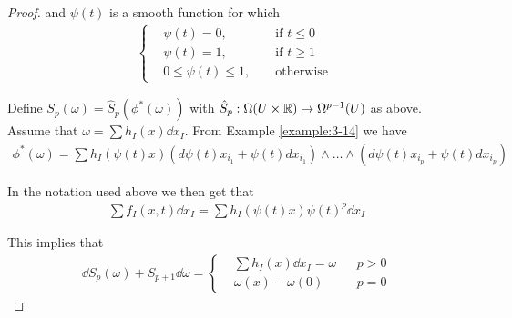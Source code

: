 \begin{proof}
and $\psi(t)$ is a smooth function for which 
\begin{align}
  \left\{\begin{aligned}
    & \psi(t) = 0, && \text{ if } t\le 0 \\
    & \psi(t) = 1, && \text{ if } t\ge 1 \\
    & 0\le\psi(t)\le 1, && \text{ otherwise }
  \end{aligned}\right.
\end{align}

Define $S_p(\omega) = \hat{S}_p(\phi^*(\omega))$ with $\hat{S}_p:\Omega(U\times{\ensuremath{\mathbb{R}}})\to\Omega^{p-1}(U)$ as above. Assume 
that $\omega = \sum h_I(x)\dd x_I$. From Example \ref{example:3-14} we have 
\begin{align*}
  \phi^{*}(\omega)
  = \sum h_{I}(\psi(t)x)(d\psi(t)x_{i_{1}}+\psi(t)dx_{i_{1}})
    \wedge\ldots\wedge\left(d\psi(t)x_{i_{p}}+\psi(t)dx_{i_{p}}\right)  
\end{align*}

In the notation used above we then get that 
\begin{align*}
  \sum f_I(x, t)\dd x_I = \sum h_I(\psi(t)x)\psi(t)^p\dd x_I
\end{align*}

This implies that 
\begin{align*}
  \dd S_p(\omega) + S_{p+1}\dd\omega
  = \left\{\begin{aligned}
    & \sum h_I(x)\dd x_I = \omega &&  p > 0 \\
    & \omega(x) - \omega(0) &&  p = 0
  \end{aligned}\right.
\end{align*}
\end{proof}
